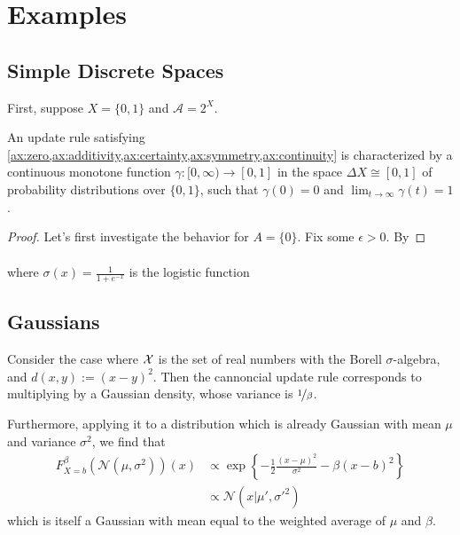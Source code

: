 \documentclass{article}
\begin{document}
\section{Examples}

\subsection{Simple Discrete Spaces}
First, suppose $X = \{0,1\}$ and $\mathcal A = 2^X$.

\begin{claim}
An update rule satisfying
\cref{ax:zero,ax:additivity,ax:certainty,ax:symmetry,ax:continuity}
is characterized by a continuous monotone function
$\gamma : [0,\infty) \to [0,1]$ in the space $\Delta X \cong [0,1]$ of probability distributions over $\{0,1\}$, such that
$\gamma(0) = 0$ and $\lim_{t\to\infty}\gamma(t) = 1$. 
\end{claim}
\begin{proof}
    Let's first investigate the behavior for $A = \{0\}$.
    Fix some $\epsilon > 0$.
    By 
\end{proof}

\begin{align*}    
\end{align*}
where $\sigma(x) = \frac{1}{1 + e^{-x}}$ is the logistic function

\subsection{Gaussians}
Consider the case where $\mathcal X$ is the set of real numbers with the Borell $\sigma$-algebra, and $d(x,y) := (x-y)^2$.
Then the cannoncial update rule corresponds to multiplying by a Gaussian density, whose variance is $\nicefrac1\beta$.

Furthermore, applying it to a distribution which is already Gaussian with mean $\mu$ and variance $\sigma^2$, we find that
\begin{align*}
    F^{\beta}_{X=b}(\mathcal N(\mu, \sigma^2))(x) &\propto
        \exp\left\{ - \frac12 \frac{(x-\mu)^2}{ \sigma^2 } - \beta(x-b)^2\right\}
    \\&\propto \mathcal N(x| \mu', \sigma'^2)
\end{align*}
which is itself a Gaussian with mean equal to the weighted average of $\mu$ and $\beta$.
\end{document}
